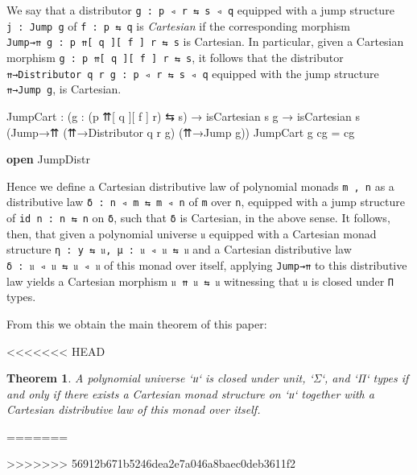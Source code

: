 \documentclass[
  11pt,
  oneside,
  article]{memoir}
\newenvironment{Shaded}{}{}
\newcommand{\KeywordTok}[1]{\textcolor[rgb]{0.00,0.44,0.13}{\textbf{#1}}}
\newcommand{\NormalTok}[1]{#1}
\newcommand{\OtherTok}[1]{\textcolor[rgb]{0.00,0.44,0.13}{#1}}
\theoremstyle{definition}
\theoremstyle{plain}
\newtheorem{theorem}[definitionx]{Theorem}
\newcommand{\0}{\textsf{0}}
\newcommand{\1}{\tn{\textsf{1}}}
\begin{document}
We say that a distributor \texttt{g\ :\ p\ ◃\ r\ ⇆\ s\ ◃\ q} equipped
with a jump structure \texttt{j\ :\ Jump\ g} of \texttt{f\ :\ p\ ⇆\ q}
is \emph{Cartesian} if the corresponding morphism
\texttt{Jump→⇈\ g\ :\ p\ ⇈{[}\ q\ {]}{[}\ f\ {]}\ r\ ⇆\ s} is Cartesian.
In particular, given a Cartesian morphism
\texttt{g\ :\ p\ ⇈{[}\ q\ {]}{[}\ f\ {]}\ r\ ⇆\ s}, it follows that the
distributor \texttt{⇈→Distributor\ q\ r\ g\ :\ p\ ◃\ r\ ⇆\ s\ ◃\ q}
equipped with the jump structure \texttt{⇈→Jump\ g}, is Cartesian.

\begin{Shaded}
\begin{Highlighting}[]
\NormalTok{    JumpCart }\OtherTok{:} \OtherTok{(}\NormalTok{g }\OtherTok{:} \OtherTok{(}\NormalTok{p ⇈[ q ][ f ] r}\OtherTok{)}\NormalTok{ ⇆ s}\OtherTok{)} \OtherTok{→}\NormalTok{ isCartesian s g}
               \OtherTok{→}\NormalTok{ isCartesian s }\OtherTok{(}\NormalTok{Jump→⇈ }\OtherTok{(}\NormalTok{⇈→Distributor q r g}\OtherTok{)} \OtherTok{(}\NormalTok{⇈→Jump g}\OtherTok{))}
\NormalTok{    JumpCart g cg }\OtherTok{=}\NormalTok{ cg}

\KeywordTok{open}\NormalTok{ JumpDistr}
\end{Highlighting}
\end{Shaded}

Hence we define a Cartesian distributive law of polynomial monads
\texttt{m\ ,\ n} as a distributive law
\texttt{δ\ :\ n\ ◃\ m\ ⇆\ m\ ◃\ n} of \texttt{m} over \texttt{n},
equipped with a jump structure of \texttt{id\ n\ :\ n\ ⇆\ n} on
\texttt{δ}, such that \texttt{δ} is Cartesian, in the above sense. It
follows, then, that given a polynomial universe \texttt{𝔲} equipped with
a Cartesian monad structure \texttt{η\ :\ y\ ⇆\ 𝔲,\ μ\ :\ 𝔲\ ◃\ 𝔲\ ⇆\ 𝔲}
and a Cartesian distributive law \texttt{δ\ :\ 𝔲\ ◃\ 𝔲\ ⇆\ 𝔲\ ◃\ 𝔲} of
this monad over itself, applying \texttt{Jump→⇈} to this distributive
law yields a Cartesian morphism \texttt{𝔲\ ⇈\ 𝔲\ ⇆\ 𝔲} witnessing that
\texttt{𝔲} is closed under \texttt{Π} types.

From this we obtain the main theorem of this paper:

<<<<<<< HEAD
\begin{theorem}
A polynomial universe `𝔲` is closed under unit, `Σ`, and `Π` types if and only if there exists a Cartesian monad structure on `𝔲` together with a Cartesian distributive law of this monad over itself.
\end{theorem}
=======
\mytheorem

>>>>>>> 56912b671b5246dea2e7a046a8baec0deb3611f2
\end{document}
